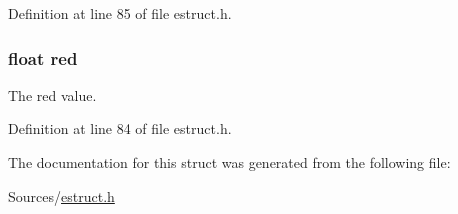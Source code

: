 Definition at line 85 of file estruct.\-h.

\hypertarget{struct__rgb_acddf4f34ba92c602d4205ba50e98d603}{
\subsubsection[{red}]{\setlength{\rightskip}{0pt plus 5cm}float red}}\label{struct__rgb_acddf4f34ba92c602d4205ba50e98d603}
The red value. 

Definition at line 84 of file estruct.\-h.



The documentation for this struct was generated from the following file\-:\begin{DoxyCompactItemize}
\item 
Sources/\hyperlink{estruct_8h}{estruct.\-h}\end{DoxyCompactItemize}
